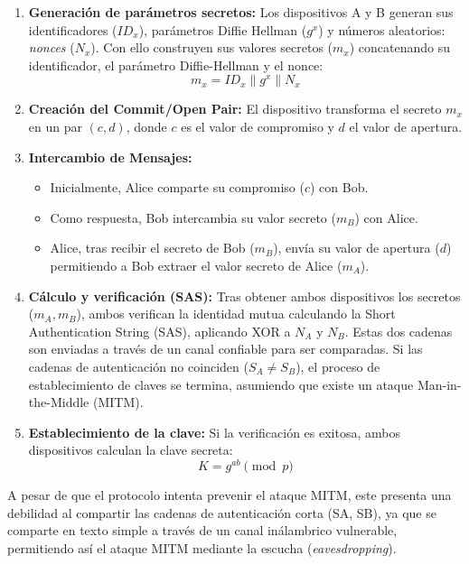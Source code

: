 \documentclass[conference,a4paper,onecolumn,11pt]{IEEEtran} %
\begin{document}
\begin{enumerate}
    \item \textbf{Generación de parámetros secretos:} Los dispositivos A y B generan sus identificadores ($ID_x$), parámetros Diffie Hellman ($g^x$) y números aleatorios: \textit{nonces} ($N_x$). Con ello construyen sus valores secretos ($m_x$) concatenando su identificador, el parámetro Diffie-Hellman y el nonce:
    \begin{equation}
        m_x = ID_x \parallel g^x \parallel N_x
    \end{equation}
    \item \textbf{Creación del Commit/Open Pair:} El dispositivo transforma el secreto $m_x$ en un par $(c, d)$, donde $c$ es el valor de compromiso y $d$ el valor de apertura.
    \item \textbf{Intercambio de Mensajes:}
    \begin{itemize}
        \item Inicialmente, Alice comparte su compromiso ($c$) con Bob.
        \item Como respuesta, Bob intercambia su valor secreto ($m_B$) con Alice.
        \item Alice, tras recibir el secreto de Bob ($m_B$), envía su valor de apertura ($d$) permitiendo a Bob extraer el valor secreto de Alice ($m_A$).
    \end{itemize}
    \item \textbf{Cálculo y verificación (SAS):} Tras obtener ambos dispositivos los secretos ($m_A, m_B$), ambos verifican la identidad mutua calculando la Short Authentication String (SAS), aplicando XOR a $N_A$ y $N_B$. Estas dos cadenas son enviadas a través de un canal confiable para ser comparadas. Si las cadenas de autenticación no coinciden ($S_A \neq S_B$), el proceso de establecimiento de claves se termina, asumiendo que existe un ataque Man-in-the-Middle (MITM).
    \item \textbf{Establecimiento de la clave:} Si la verificación es exitosa, ambos dispositivos calculan la clave secreta:
    \begin{equation}
        K = g^{ab} \pmod p
    \end{equation}
\end{enumerate}

A pesar de que el protocolo intenta prevenir el ataque MITM, este presenta una debilidad al compartir las cadenas de autenticación corta (SA, SB), ya que se comparte en texto simple a través de un canal inálambrico vulnerable, permitiendo así el ataque MITM mediante la escucha  (\textit{eavesdropping}).
\end{document}
